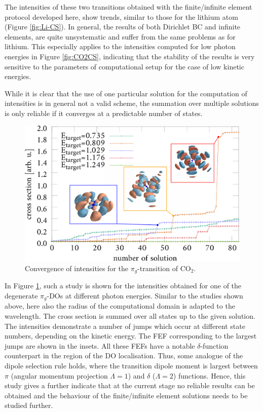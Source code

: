 The intensities of these two transitions obtained with the finite/infinite element protocol developed here, show trends, similar to those for the lithium atom (Figure \ref{fig:Li-CS}).
In general, the results of both Dirichlet BC and infinite elements, are quite unsystematic and suffer from the same problems as for lithium.
This especially applies to the intensities computed for low photon energies in Figure \ref{fig:CO2CS}, indicating that the stability of the results is very sensitive to the parameters of computational setup for the case of low kinetic energies.

While it is clear that the use of one particular solution for the computation of intensities is in general not a valid scheme, the summation over multiple solutions is only reliable if it converges at a predictable number of states.
\begin{figure}
\includegraphics[width=\textwidth]{Figures/CO2/Cronverge}
\caption{Convergence of intensities for the $\pi_g$-transition of CO$_2$.}
\label{fig:cronverge}
\end{figure}
In Figure \ref{fig:cronverge}, such a study is shown for the intensities obtained for one of the degenerate $\pi_g$-DOs at different photon energies.
Similar to the studies shown above, here also the radius of the computational domain is adapted to the wavelength.
The cross section is summed over all states up to the given solution.
The intensities demonstrate a number of jumps which occur at different state numbers, depending on the kinetic energy.
The FEF corresponding to the largest jumps are shown in the insets.
All these FEFs have a notable $\delta$-function counterpart in the region of the DO localisation.
Thus, some analogue of the dipole selection rule holds, where the transition dipole moment is largest between $\pi$ (angular momentum projection $\Lambda=1$) and $\delta$ ($\Lambda=2$) functions.
Hence, this study gives a further indicate that at the current stage no reliable results can be obtained and the behaviour of the finite/infinite element solutions needs to be studied further.


